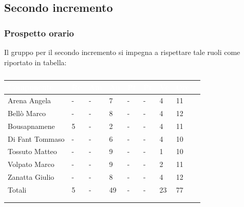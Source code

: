   \subsection{Secondo incremento} 
    {
    \subsubsection{Prospetto orario}
    {
    Il gruppo per il secondo incremento si impegna a rispettare tale ruoli come riportato in tabella:
      \setlength{\freewidth}{\dimexpr\textwidth-30\tabcolsep}
      \renewcommand{\arraystretch}{1.0}
      \setlength{\aboverulesep}{0pt}
      \setlength{\belowrulesep}{0pt}
      \begin{longtable}{C{.4\freewidth} C{.1\freewidth} C{.1\freewidth} C{.1\freewidth} C{.1\freewidth} C{.1\freewidth} C{.1\freewidth} C{.1\freewidth} C{.1\freewidth}}
      \toprule
      \textcolor{white}{\textbf{Componente}}&
      \textcolor{white}{\textbf{Re}}&
      \textcolor{white}{\textbf{Am}}&
      \textcolor{white}{\textbf{An}}&
      \textcolor{white}{\textbf{Pt}}&
      \textcolor{white}{\textbf{Pr}}&
      \textcolor{white}{\textbf{Ve}}&
      \textcolor{white}{\textbf{Ore}}\\
      \toprule
      \endhead

      Arena Angela & - & - & 7  & - & - & 4 & 11 \\      
      Bellò Marco & - & - & 8 & - & - & 4 & 12 \\      
      Bousapnamene & 5 & - & 2 & - & - & 4 & 11 \\      
      Di Fant Tommaso & - & - & 6 & - & - & 4 & 10 \\      
      Tossuto Matteo & - & - & 9 & - & - & 1 & 10 \\      
      Volpato Marco & - & - & 9 & - & - & 2 & 11 \\      
      Zanatta Giulio & - & - & 8 & - & - & 4 & 12 \\      
      Totali & 5 & - & 49 & - & - & 23 & 77 \\
      \bottomrule
      \\
      \caption{}


\end{longtable}}}
